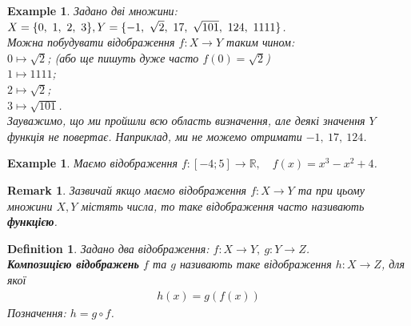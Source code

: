 \documentclass[a4paper, 14pt]{extarticle}
\theoremstyle{theoremdd}
\theoremstyle{theoremdd}
\newtheorem{definition}[theorem]{Definition}
\theoremstyle{theoremdd}
\theoremstyle{theoremdd}
\theoremstyle{theoremdd}
\newtheorem{example}[theorem]{Example}
\theoremstyle{theoremdd}
\theoremstyle{theoremdd}
\theoremstyle{theoremdd}
\theoremstyle{theoremdd}
\theoremstyle{theoremdd}
\theoremstyle{theoremdd}
\newtheorem{remark}[theorem]{Remark}
\theoremstyle{theoremdd}
\theoremstyle{theoremdd}
\theoremstyle{theoremdd}
\theoremstyle{theoremdd}
\begin{document}
	\begin{example}
	Задано дві множини: \\
	$X = \{0,\ 1,\ 2,\ 3 \}, \\ Y = \{-1,\ \sqrt{2},\ 17,\ \sqrt{101},\ 124,\ 1111\}$. \\
	Можна побудувати відображення $f \colon X \to Y$ таким чином:\\
	$0 \mapsto \sqrt{2}$; \quad (або ще пишуть дуже часто $f(0) = \sqrt{2}$)\\
	$1 \mapsto 1111$;\\
	$2 \mapsto \sqrt{2}$;\\
	$3 \mapsto \sqrt{101}$.\\
	Зауважимо, що ми пройшли всю область визначення, але деякі значення $Y$ функція не повертає. Наприклад, ми не можемо отримати $-1,\ 17,\ 124$.
	\end{example}
	
	\begin{example}
	Маємо відображення $f \colon [-4; 5] \to \mathbb{R}, \quad f(x) = x^3-x^2+4$.
	\end{example}
	
	\begin{remark}
	Зазвичай якщо маємо відображення $f \colon X \to Y$ та при цьому множини $X,Y$ містять числа, то таке відображення часто називають \textbf{функцією}.
	\end{remark}
	
	\begin{definition}
	Задано два відображення: $f \colon X \to Y,\ g \colon Y \to Z$.\\
	\textbf{Композицією відображень} $f$ та $g$ називають таке відображення $h \colon X \to Z$, для якої
	\begin{align*}
	h(x) = g(f(x))
	\end{align*}
	Позначення: $h = g \circ f$.
	\begin{figure}[H]
\end{figure}
	\end{definition}
	
\end{document}

